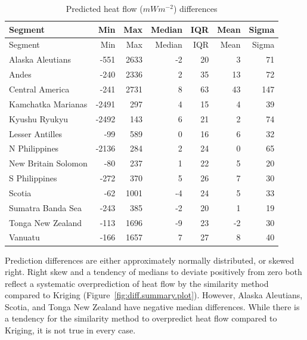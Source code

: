 \documentclass[draft,linenumbers]{agujournal2018}
\begin{document}
\hypertarget{tbl:diff.summary.table}{}
\begin{longtable}[]{@{}lrrrrrr@{}}
\caption{\label{tbl:diff.summary.table}Predicted heat flow
(\(mWm^{-2}\)) differences}\tabularnewline
\toprule
Segment & Min & Max & Median & IQR & Mean & Sigma \\
\midrule
\endfirsthead
\toprule
Segment & Min & Max & Median & IQR & Mean & Sigma \\
\midrule
\endhead
Alaska Aleutians & -551 & 2633 & -2 & 20 & 3 & 71 \\
Andes & -240 & 2336 & 2 & 35 & 13 & 72 \\
Central America & -241 & 2731 & 8 & 63 & 43 & 147 \\
Kamchatka Marianas & -2491 & 297 & 4 & 15 & 4 & 39 \\
Kyushu Ryukyu & -2492 & 143 & 6 & 21 & 2 & 74 \\
Lesser Antilles & -99 & 589 & 0 & 16 & 6 & 32 \\
N Philippines & -2136 & 284 & 2 & 24 & 0 & 65 \\
New Britain Solomon & -80 & 237 & 1 & 22 & 5 & 20 \\
S Philippines & -272 & 370 & 5 & 26 & 7 & 30 \\
Scotia & -62 & 1001 & -4 & 24 & 5 & 33 \\
Sumatra Banda Sea & -243 & 385 & -2 & 20 & 1 & 19 \\
Tonga New Zealand & -113 & 1696 & -9 & 23 & -2 & 30 \\
Vanuatu & -166 & 1657 & 7 & 27 & 8 & 40 \\
\bottomrule
\end{longtable}

Prediction differences are either approximately normally distributed, or
skewed right. Right skew and a tendency of medians to deviate positively
from zero both reflect a systematic overprediction of heat flow by the
similarity method compared to Kriging
(Figure~\ref{fig:diff.summary.plot}). However, Alaska Aleutians, Scotia,
and Tonga New Zealand have negative median differences. While there is a
tendency for the similarity method to overpredict heat flow compared to
Kriging, it is not true in every case.
\end{document}
